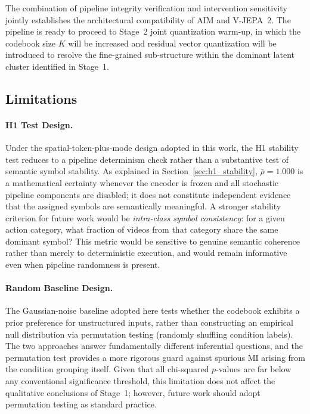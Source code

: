 \documentclass{article}
\begin{document}
The combination of pipeline integrity verification and intervention
sensitivity jointly establishes the architectural compatibility of
AIM and V-JEPA~2.
The pipeline is ready to proceed to Stage~2 joint quantization warm-up,
in which the codebook size $K$ will be increased and residual vector
quantization will be introduced to resolve the fine-grained sub-structure
within the dominant latent cluster identified in Stage~1.

\subsection{Limitations}

\paragraph{H1 Test Design.}
Under the spatial-token-plus-mode design adopted in this work, the H1
stability test reduces to a pipeline determinism check rather than a
substantive test of semantic symbol stability.  As explained in
Section~\ref{sec:h1_stability}, $\bar{\rho} = 1.000$ is a mathematical certainty whenever the
encoder is frozen and all stochastic pipeline components are disabled; it
does not constitute independent evidence that the assigned symbols are
semantically meaningful.  A stronger stability criterion for future work
would be \emph{intra-class symbol consistency}: for a given action category,
what fraction of videos from that category share the same dominant symbol?
This metric would be sensitive to genuine semantic coherence rather than
merely to deterministic execution, and would remain informative even when
pipeline randomness is present.

\paragraph{Random Baseline Design.}
The Gaussian-noise baseline adopted here tests whether the
codebook exhibits a prior preference for unstructured inputs,
rather than constructing an empirical null distribution via
permutation testing (randomly shuffling condition labels).
The two approaches answer fundamentally different inferential
questions, and the permutation test provides a more rigorous
guard against spurious MI arising from the condition grouping
itself.  Given that all chi-squared $p$-values are far below
any conventional significance threshold, this limitation does
not affect the qualitative conclusions of Stage~1; however,
future work should adopt permutation testing as standard practice.
\end{document}

